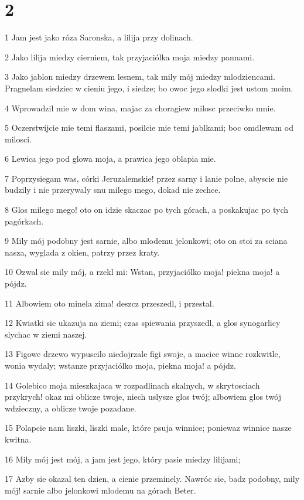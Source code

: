 \chapter{2}

\par 1 Jam jest jako róza Saronska, a lilija przy dolinach.
\par 2 Jako lilija miedzy cierniem, tak przyjaciólka moja miedzy pannami.
\par 3 Jako jablon miedzy drzewem lesnem, tak mily mój miedzy mlodziencami. Pragnelam siedziec w cieniu jego, i siedze; bo owoc jego slodki jest ustom moim.
\par 4 Wprowadzil mie w dom wina, majac za choragiew milosc przeciwko mnie.
\par 5 Oczerstwijcie mie temi flaszami, posilcie mie temi jablkami; boc omdlewam od milosci.
\par 6 Lewica jego pod glowa moja, a prawica jego oblapia mie.
\par 7 Poprzysiegam was, córki Jeruzalemskie! przez sarny i lanie polne, abyscie nie budzily i nie przerywaly snu milego mego, dokad nie zechce.
\par 8 Glos milego mego! oto on idzie skaczac po tych górach, a poskakujac po tych pagórkach.
\par 9 Mily mój podobny jest sarnie, albo mlodemu jelonkowi; oto on stoi za sciana nasza, wyglada z okien, patrzy przez kraty.
\par 10 Ozwal sie mily mój, a rzekl mi: Wstan, przyjaciólko moja! piekna moja! a pójdz.
\par 11 Albowiem oto minela zima! deszcz przeszedl, i przestal.
\par 12 Kwiatki sie ukazuja na ziemi; czas spiewania przyszedl, a glos synogarlicy slychac w ziemi naszej.
\par 13 Figowe drzewo wypuscilo niedojrzale figi swoje, a macice winne rozkwitle, wonia wydaly; wstanze przyjaciólko moja, piekna moja! a pójdz.
\par 14 Golebico moja mieszkajaca w rozpadlinach skalnych, w skrytosciach przykrych! okaz mi oblicze twoje, niech uslysze glos twój; albowiem glos twój wdzieczny, a oblicze twoje pozadane.
\par 15 Polapcie nam liszki, liszki male, które psuja winnice; poniewaz winnice nasze kwitna.
\par 16 Mily mój jest mój, a jam jest jego, który pasie miedzy lilijami;
\par 17 Azby sie okazal ten dzien, a cienie przeminely. Nawróc sie, badz podobny, mily mój! sarnie albo jelonkowi mlodemu na górach Beter.

